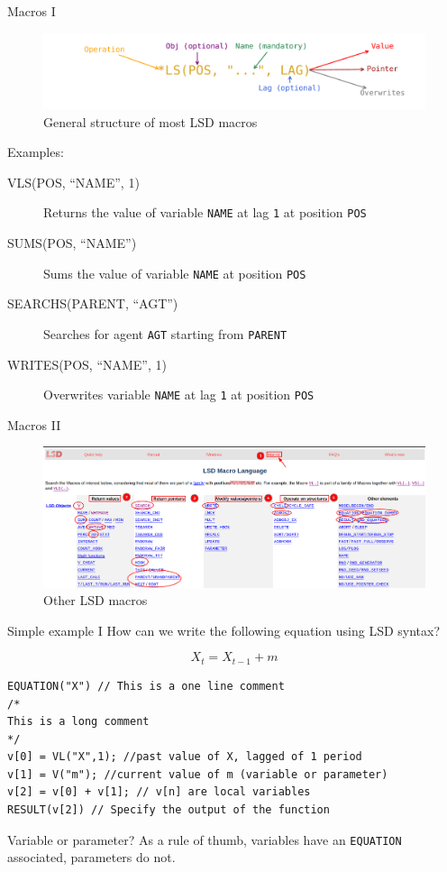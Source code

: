 \documentclass[bigger,aspectratio=169]{beamer}
\begin{document}
\begin{frame}[label={sec:org2c3d4e2},fragile]{Macros I}
 \begin{figure}[htbp]
\centering
\includegraphics[width=.9\linewidth]{./figs/Macros_LSD.pdf}
\caption{\label{}General structure of most LSD macros}
\end{figure}

Examples:
\begin{description}
\item[{VLS(POS, ``NAME'', 1)}] Returns the value of variable \texttt{NAME} at lag \texttt{1} at position \texttt{POS}
\item[{SUMS(POS, ``NAME'')}] Sums the value of variable \texttt{NAME} at position \texttt{POS}
\item[{SEARCHS(PARENT, ``AGT'')}] Searches for agent \texttt{AGT} starting from \texttt{PARENT}
\item[{WRITES(POS, ``NAME'', 1)}] Overwrites variable \texttt{NAME} at lag \texttt{1} at position \texttt{POS}
\end{description}
\end{frame}
\begin{frame}[label={sec:org27be82f}]{Macros II}
\begin{figure}[htbp]
\centering
\includegraphics[width=.9\linewidth]{figs/LSD_Macros_ScreenShot.png}
\caption{Other LSD macros}
\end{figure}
\end{frame}
\begin{frame}[label={sec:org89db4f9},fragile]{Simple example I}
 How can we write the following equation using LSD syntax?

\[X_{t} = X_{t-1} + m\]

\begin{verbatim}
EQUATION("X") // This is a one line comment
/*
This is a long comment
*/
v[0] = VL("X",1); //past value of X, lagged of 1 period
v[1] = V("m"); //current value of m (variable or parameter)
v[2] = v[0] + v[1]; // v[n] are local variables
RESULT(v[2]) // Specify the output of the function
\end{verbatim}
\begin{block}{Variable or parameter?}
As a rule of thumb, variables have an \texttt{EQUATION} associated, parameters do not.
\end{block}
\end{frame}
\end{document}
